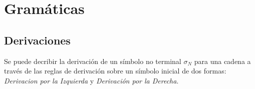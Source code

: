 \section{Gramáticas}


\subsection{Derivaciones}

 Se puede decribir la derivación de un símbolo no terminal $\sigma_N$ para
una cadena a través de las reglas de derivación sobre un símbolo inicial de dos
formas: \textit{Derivacion por la Izquierda} y \textit{Derivación por la
Derecha}.


